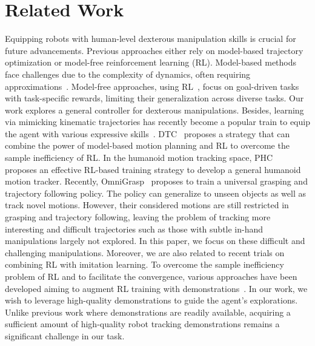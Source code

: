 

\vspace{-10pt}

\section{Related Work}

\vspace{-5pt}


Equipping robots with human-level dexterous manipulation skills is crucial for future advancements. Previous approaches either rely on model-based trajectory optimization or model-free reinforcement learning (RL). Model-based methods face challenges due to the complexity of dynamics, often requiring approximations~\citep{pang2023global,Jin2024ComplementarityFreeMM,pang2021convex}. Model-free approaches, using RL~\citep{rajeswaran2017learning,chen2023visual,chen2021system,christen2022d,zhang2023artigrasp,qin2022dexmv,liu2022herd,wu2023learning,gupta2016learning,wang2023physhoi,mordatch2012contact}, focus on goal-driven tasks with task-specific rewards, limiting their generalization across diverse tasks.
Our work explores a general controller for dexterous manipulations. Besides, learning via mimicking kinematic trajectories has recently become a popular train to equip the agent with various expressive skills~\citep{Jenelten2023DTCDT,Luo2023PerpetualHC,Luo2023UniversalHM}. DTC~\citep{Jenelten2023DTCDT} proposes a strategy that can combine the power of model-based motion planning and RL to overcome the sample inefficiency of RL. 
In the humanoid motion tracking space, PHC~\citep{Luo2023PerpetualHC} proposes an effective RL-based training strategy to develop a general humanoid motion tracker. Recently, OmniGrasp~\citep{Luo2024GraspingDO} proposes to train a universal grasping and trajectory following policy. The policy can generalize to unseen objects as well as track novel motions. However, their considered motions are still restricted in grasping and trajectory following, leaving the problem of tracking more interesting and difficult trajectories such as those with subtle in-hand manipulations largely not explored. In this paper, we focus on these difficult and challenging manipulations. Moreover, we are also related to recent trials on combining RL with imitation learning. To overcome the sample inefficiency problem of RL and to facilitate the convergence, various approaches have been developed aiming to augment RL training with demonstrations~\citep{Sun2018TruncatedHP,Hester2017DeepQF,Booher2024CIMRLCI,Liu2023BlendingIA}. In our work, we wish to leverage high-quality demonstrations to guide the agent's explorations. Unlike previous work where demonstrations are readily available, acquiring a sufficient amount of high-quality robot tracking demonstrations remains a significant challenge in our task.
